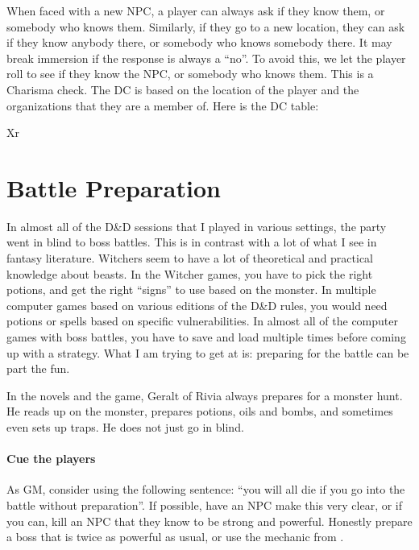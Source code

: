 \documentclass[twocolumn]{dndbook}
\begin{document}
When faced with a new NPC, a player can always ask if they know them, or somebody who knows them.
Similarly, if they go to a new location, they can ask if they know anybody there, or somebody who knows somebody there.
It may break immersion if the response is always a ``no''.
To avoid this, we let the player roll to see if they know the NPC, or somebody who knows them.
This is a Charisma check.
The DC is based on the location of the player and the organizations that they are a member of.
Here is the DC table:

\begin{DndTable}[header=Networking DC]{Xr}
\end{DndTable}


\section{Battle Preparation}
\label{sec:battle_preparation}

In almost all of the D\&D sessions that I played in various settings, the party went in blind to boss battles.
This is in contrast with a lot of what I see in fantasy literature.
Witchers seem to have a lot of theoretical and practical knowledge about beasts.
In the Witcher games, you have to pick the right potions, and get the right ``signs'' to use based on the monster.
In multiple computer games based on various editions of the D\&D rules, you would need potions or spells based on specific vulnerabilities.
In almost all of the computer games with boss battles, you have to save and load multiple times before coming up with a strategy.
What I am trying to get at is: preparing for the battle can be part the fun.\par

\begin{emphasisParagraph}
	In the novels and the game, Geralt of Rivia always prepares for a monster hunt.
	He reads up on the monster, prepares potions, oils and bombs,
	and sometimes even sets up traps.
	He does not just go in blind.
\end{emphasisParagraph}

\paragraph*{Cue the players}
As GM, consider using the following sentence: ``you will all die if you go into the battle without preparation''.
If possible, have an NPC make this very clear, or if you can, kill an NPC that they know to be strong and powerful.
Honestly prepare a boss that is twice as powerful as usual, or use the mechanic from .\par
\end{document}
